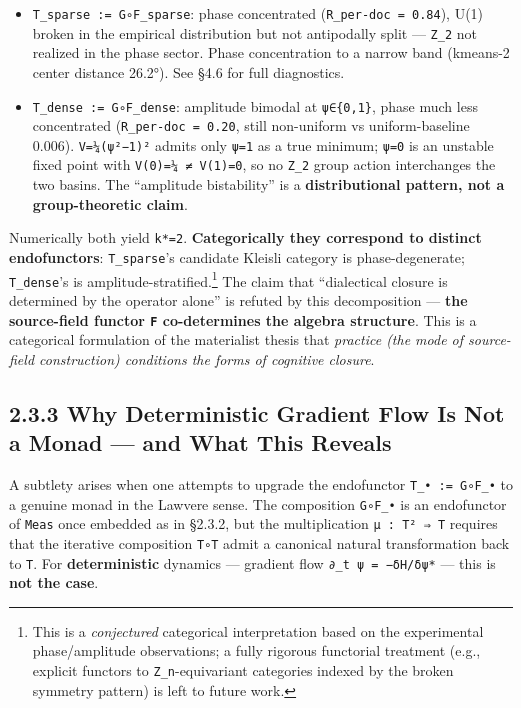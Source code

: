 \documentclass[
]{article}
\providecommand{\tightlist}{%
  \setlength{\itemsep}{0pt}\setlength{\parskip}{0pt}}
\begin{document}
\begin{itemize}
\tightlist
\item
  \texttt{T\_sparse\ :=\ G∘F\_sparse}: phase concentrated
  (\texttt{\textbar{}R\textbar{}\_per-doc\ =\ 0.84}), U(1) broken in the
  empirical distribution but not antipodally split --- \texttt{Z\_2} not
  realized in the phase sector. Phase concentration to a narrow band
  (kmeans-2 center distance 26.2°). See §4.6 for full diagnostics.
\item
  \texttt{T\_dense\ :=\ G∘F\_dense}: amplitude bimodal at
  \texttt{\textbar{}ψ\textbar{}∈\{0,1\}}, phase much less concentrated
  (\texttt{\textbar{}R\textbar{}\_per-doc\ =\ 0.20}, still non-uniform
  vs uniform-baseline 0.006). \texttt{V=¼(\textbar{}ψ\textbar{}²−1)²}
  admits only \texttt{\textbar{}ψ\textbar{}=1} as a true minimum;
  \texttt{\textbar{}ψ\textbar{}=0} is an unstable fixed point with
  \texttt{V(0)=¼\ ≠\ V(1)=0}, so no \texttt{Z\_2} group action
  interchanges the two basins. The ``amplitude bistability'' is a
  \textbf{distributional pattern, not a group-theoretic claim}.
\end{itemize}

Numerically both yield \texttt{k*=2}. \textbf{Categorically they
correspond to distinct endofunctors}: \texttt{T\_sparse}'s candidate
Kleisli category is phase-degenerate; \texttt{T\_dense}'s is
amplitude-stratified.\footnote{This is a \emph{conjectured} categorical
  interpretation based on the experimental phase/amplitude observations;
  a fully rigorous functorial treatment (e.g., explicit functors to
  \texttt{Z\_n}-equivariant categories indexed by the broken symmetry
  pattern) is left to future work.} The claim that ``dialectical closure
is determined by the operator alone'' is refuted by this decomposition
--- \textbf{the source-field functor \texttt{F} co-determines the
algebra structure}. This is a categorical formulation of the materialist
thesis that \emph{practice (the mode of source-field construction)
conditions the forms of cognitive closure}.

\hypertarget{why-deterministic-gradient-flow-is-not-a-monad-and-what-this-reveals}{%
\subsection{2.3.3 Why Deterministic Gradient Flow Is Not a Monad --- and
What This
Reveals}\label{why-deterministic-gradient-flow-is-not-a-monad-and-what-this-reveals}}

A subtlety arises when one attempts to upgrade the endofunctor
\texttt{T\_•\ :=\ G∘F\_•} to a genuine monad in the Lawvere sense. The
composition \texttt{G∘F\_•} is an endofunctor of \texttt{Meas} once
embedded as in §2.3.2, but the multiplication \texttt{μ\ :\ T²\ ⇒\ T}
requires that the iterative composition \texttt{T∘T} admit a canonical
natural transformation back to \texttt{T}. For \textbf{deterministic}
dynamics --- gradient flow \texttt{∂\_t\ ψ\ =\ −δH/δψ*} --- this is
\textbf{not the case}.
\end{document}
